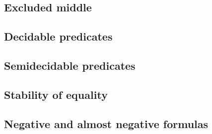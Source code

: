 \subsection{Excluded middle}
\label{sec:excluded-middle}

\subsection{Decidable predicates}
\label{sec:decidable-predicates-1}

\subsection{Semidecidable predicates}
\label{sec:semid-pred}

\subsection{Stability of equality}
\label{sec:stability-equality}

\subsection{Negative and almost negative formulas}
\label{sec:negat-almost-negat}



